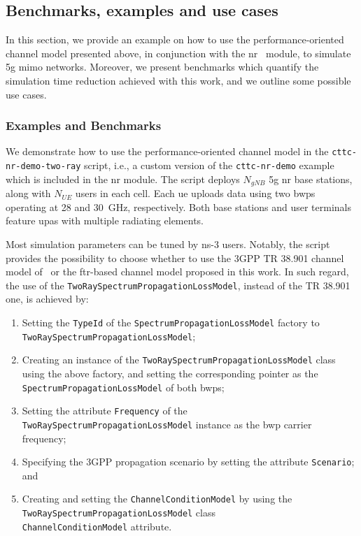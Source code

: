\subsection{Benchmarks, examples and use cases}
\label{sec:results-ch-perf}

In this section, we provide an example on how to use the performance-oriented channel model presented above, in conjunction with the \gls{nr}~\cite{patriciello2019e2e} module, to simulate \gls{5g} \gls{mimo} networks. Moreover, we present benchmarks which quantify the simulation time reduction achieved with this work, and we outline some possible use cases.

\subsubsection{Examples and Benchmarks}

We demonstrate how to use the performance-oriented channel model in the \texttt{cttc-nr-demo-two-ray} script, i.e., a custom version of the \texttt{cttc-nr-demo} example which is included in the \gls{nr} module.
The script deploys $N_{gNB}$ \gls{5g} \gls{nr} base stations, along with $N_{UE}$ users in each cell. Each \gls{ue} uploads data using two \glspl{bwp} operating at 28 and 30~GHz, respectively. Both base stations and user terminals feature \glspl{upa} with multiple radiating elements.


Most simulation parameters can be tuned by ns-3 users. Notably, the script provides the possibility to choose whether to use the 3GPP TR 38.901 channel model of~\cite{tommaso:20} or the \gls{ftr}-based channel model proposed in this work.
In such regard, the use of the \texttt{Two\-Ray\-Spectrum\-Propagation\-Loss\-Model}, instead of the TR 38.901 one, is achieved by:
\begin{enumerate}
\item Setting the \texttt{TypeId} of the \texttt{Spectrum\-Propagation\-Loss\-Model} factory to \texttt{Two\-Ray\-Spectrum\-Propagation\-Loss\-Model}; 
\item Creating an instance of the \texttt{Two\-Ray\-Spectrum\-Propagation\-Loss\-Model} class using the above factory, and setting the corresponding pointer as the \texttt{Spectrum\-Propagation\-Loss\-Model} of both \glspl{bwp}; 
\item  Setting the attribute \texttt{Frequency} of the \texttt{Two\-Ray\-Spectrum\-Propagation\-Loss\-Model} instance as the \gls{bwp} carrier frequency; 
\item  Specifying the 3GPP propagation scenario by setting the attribute \texttt{Scenario}; and 
\item  Creating and setting the \texttt{Channel\-Condition\-Model} by using the \texttt{Two\-Ray\-Spectrum\-Propagation\-Loss\-Model} class \\ \texttt{ChannelConditionModel} attribute. 
\end{enumerate}

